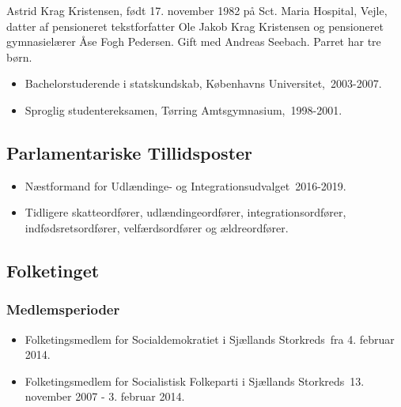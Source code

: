 \documentclass[11pt, a4paper]{awesome-cv}
\begin{document}
\makecvheader[R]
\makelettertitle
\begin{cvletter}
Astrid Krag Kristensen, født 17. november 1982 på Sct. Maria Hospital, Vejle, datter af pensioneret tekstforfatter Ole Jakob Krag Kristensen og pensioneret gymnasielærer Åse Fogh Pedersen. Gift med Andreas Seebach. Parret har tre børn.

\begin{itemize}
\item Bachelorstuderende i statskundskab, Københavns Universitet, 2003-2007.
\item Sproglig studentereksamen, Tørring Amtsgymnasium, 1998-2001.
\end{itemize}
\subsection*{Parlamentariske Tillidsposter}
\begin{itemize}
\item Næstformand for Udlændinge- og Integrationsudvalget 2016-2019.
\item Tidligere skatteordfører, udlændingeordfører, integrationsordfører, indfødsretsordfører, velfærdsordfører og ældreordfører.
\end{itemize}
\subsection*{Folketinget}
\subsubsection*{Medlemsperioder}
\begin{itemize}
\item Folketingsmedlem for Socialdemokratiet i Sjællands Storkreds fra 4. februar 2014.
\item Folketingsmedlem for Socialistisk Folkeparti i Sjællands Storkreds 13. november 2007 - 3. februar 2014.
\end{itemize}

\end{cvletter}
\end{document}

